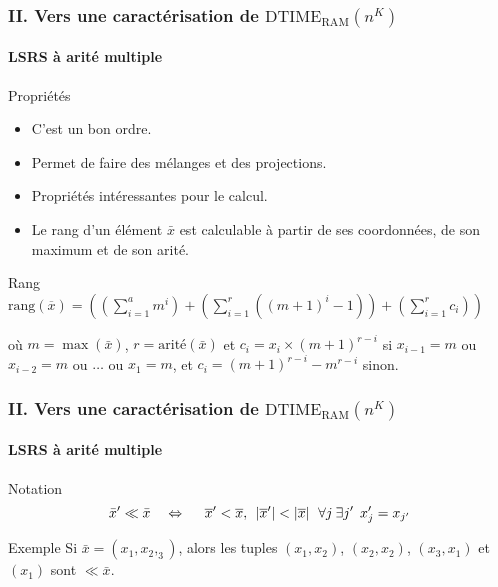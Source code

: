 \documentclass[10pt]{beamer}
\newcommand{\dtimeram}{\text{DTIME}_{\text{RAM}}\left( n^K \right)}
\newcommand{\rang}[1]{\text{rang}\left( #1 \right)}
\begin{document}
	
	\begin{frame}
		\frametitle{II. Vers une caractérisation de $\dtimeram$}
		\framesubtitle{LSRS à arité multiple}
		
		\begin{block}{Propriétés}
			\begin{itemize}
				\item 	C'est un bon ordre. %
				\item 	Permet de faire des mélanges et des projections. %
				\item 	Propriétés intéressantes pour le calcul. %
				\item 	Le rang d'un élément $\bar{x}$ est calculable à partir de ses coordonnées, de son maximum et de son arité.
			\end{itemize}
		\end{block}
		
		\pause 
		
		\begin{block}{Rang}
			$\rang{\overline{x}} = \left( \left( \sum_{i=1}^{a} m^i \right) + \left( \sum_{i=1}^{r} \left( \left(m+1\right)^i -1 \right) \right) + \left(\sum_{i=1}^{r} c_i \right) \right)$
			
			où $m = \max\left(\bar{x}\right)$, $r = \text{arité}(\bar{x})$ et $c_i = x_i \times \left(m+1\right)^{r-i}$ si $x_{i-1} = m$ ou $x_{i-2} = m$ ou $\dots$ ou $x_{1} = m$, et $c_i = \left(m+1\right)^{r-i}-m^{r-i}$ sinon. 
		\end{block}
		
	\end{frame}
	
	
	\begin{frame}
		\frametitle{II. Vers une caractérisation de $\dtimeram$}
		\framesubtitle{LSRS à arité multiple}
		
		\begin{block}{Notation}
			\[
				\bar{x}' \ll \bar{x} \ \ \ \Leftrightarrow \ \ \ \ \overline{x}' < \overline{x}, \:\: \left|\overline{x}'\right| < \left|\overline{x}\right| \:\: \forall j \: \exists j' \:\: x'_j = x_{j'}
			\]
		\end{block}
		
		\begin{block}{Exemple}
			Si $\bar{x} = \left( x_1, x_2, _3 \right)$, alors les tuples $(x_1, x_2)$, $(x_2,x_2)$, $(x_3, x_1)$ et $(x_1)$ sont $\ll \bar{x}$.
		\end{block}
		
	\end{frame}
	
\end{document}
